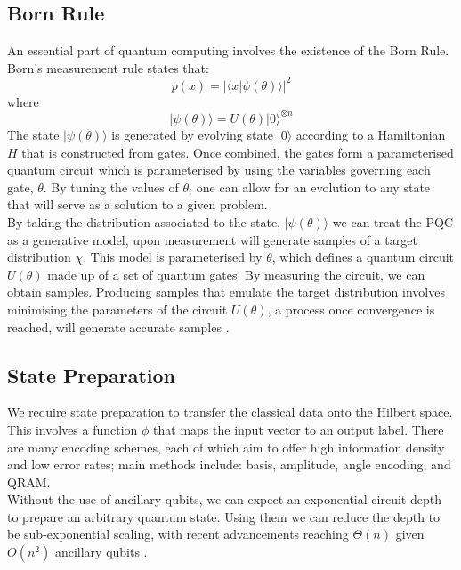 \documentclass[12pt]{article}
\numberwithin{equation}{section}
\begin{document}
\subsection{Born Rule}
An essential part of quantum computing involves the existence of the Born
Rule. Born's measurement rule states that:
\begin{equation}
p(x) = |\langle x|\psi(\theta)\rangle|^2
\end{equation} where 
\begin{equation}
|\psi(\theta)\rangle = U(\theta)|0\rangle^{\otimes n}
\end{equation}
The state $|\psi(\theta)\rangle$ is generated by evolving state $|0\rangle$
according to a Hamiltonian $H$ that is constructed from gates. Once combined, the 
gates form a parameterised quantum circuit which is parameterised by using the 
variables governing each gate, $\theta$. By tuning the values of $\theta_i$ one 
can allow for an evolution to any state that will serve as a solution to a given 
problem. \\ 
By taking the distribution associated to the state, $|\psi(\theta)\rangle$ we can 
treat the PQC as a generative model, upon measurement will 
generate samples of a target distribution $\chi$. This model is parameterised 
by $\theta$, which defines a quantum circuit $U(\theta)$ made up of a set of quantum 
gates.
By measuring the circuit, we can obtain samples. Producing samples that emulate 
the target distribution involves minimising the parameters of the circuit $U(\theta)$, 
a process once convergence is reached, will generate accurate samples 
\cite{liu_differentiable_2018}.

\subsection{State Preparation}
We require state preparation to transfer the classical data onto the 
Hilbert space. This involves a function $\phi$ that maps the input vector to 
an output label. There are many encoding schemes, each of which aim to offer 
high information density and low error rates; main methods include: basis, amplitude, angle encoding, and QRAM. 
\\
Without the use of ancillary qubits, we can expect an exponential circuit depth
to prepare an arbitrary quantum state. Using them we can reduce the depth to be 
sub-exponential scaling, with recent advancements reaching $\Theta(n)$ given $O(n^2)$
ancillary qubits
\cite{shaib_efficient_2023,zhang_quantum_2022}.
\end{document}

